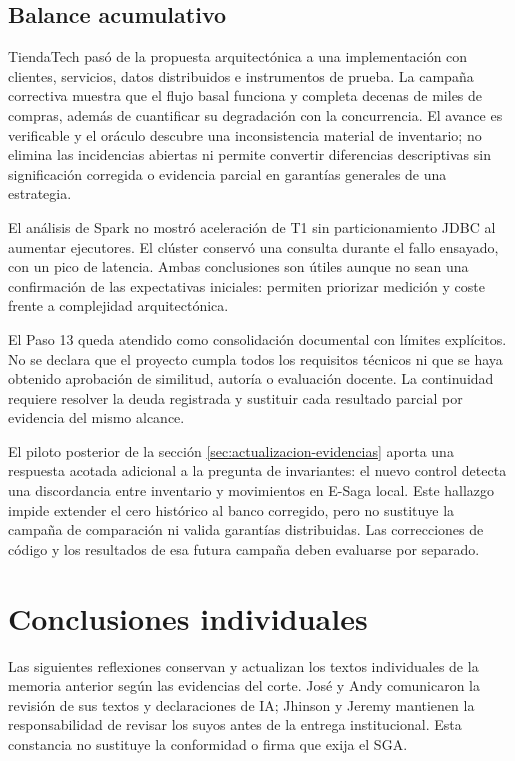 \documentclass[12pt,a4paper]{article}
\newcommand{\seccion}[1]{\section{#1}}
\begin{document}
\subsection{Balance acumulativo}
TiendaTech pasó de la propuesta arquitectónica a una implementación con clientes, servicios, datos distribuidos e instrumentos de prueba. La campaña correctiva muestra que el flujo basal funciona y completa decenas de miles de compras, además de cuantificar su degradación con la concurrencia. El avance es verificable y el oráculo descubre una inconsistencia material de inventario; no elimina las incidencias abiertas ni permite convertir diferencias descriptivas sin significación corregida o evidencia parcial en garantías generales de una estrategia.

El análisis de Spark no mostró aceleración de T1 sin particionamiento JDBC al aumentar ejecutores. El clúster conservó una consulta durante el fallo ensayado, con un pico de latencia. Ambas conclusiones son útiles aunque no sean una confirmación de las expectativas iniciales: permiten priorizar medición y coste frente a complejidad arquitectónica.

El Paso 13 queda atendido como consolidación documental con límites explícitos. No se declara que el proyecto cumpla todos los requisitos técnicos ni que se haya obtenido aprobación de similitud, autoría o evaluación docente. La continuidad requiere resolver la deuda registrada y sustituir cada resultado parcial por evidencia del mismo alcance.

El piloto posterior de la sección \ref{sec:actualizacion-evidencias} aporta una respuesta acotada adicional a la pregunta de invariantes: el nuevo control detecta una discordancia entre inventario y movimientos en E-Saga local. Este hallazgo impide extender el cero histórico al banco corregido, pero no sustituye la campaña de comparación ni valida garantías distribuidas. Las correcciones de código y los resultados de esa futura campaña deben evaluarse por separado.

\seccion{Conclusiones individuales}
Las siguientes reflexiones conservan y actualizan los textos individuales de la memoria anterior según las evidencias del corte. José y Andy comunicaron la revisión de sus textos y declaraciones de IA; Jhinson y Jeremy mantienen la responsabilidad de revisar los suyos antes de la entrega institucional. Esta constancia no sustituye la conformidad o firma que exija el SGA.
\end{document}
